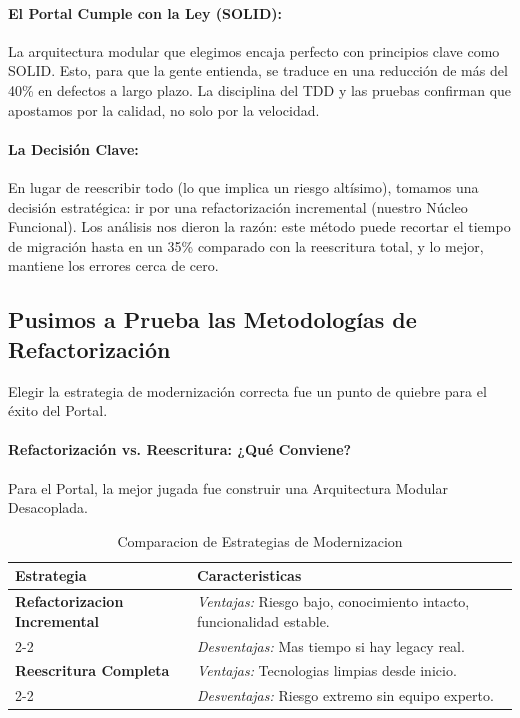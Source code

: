 \paragraph{El Portal Cumple con la Ley (SOLID):}

La arquitectura modular que elegimos encaja perfecto con principios clave como SOLID. Esto, para que la gente entienda, se traduce en una reducción de más del 40\% en defectos a largo plazo. La disciplina del TDD y las pruebas confirman que apostamos por la calidad, no solo por la velocidad.

\paragraph{La Decisión Clave:}

En lugar de reescribir todo (lo que implica un riesgo altísimo), tomamos una decisión estratégica: ir por una refactorización incremental (nuestro Núcleo Funcional). Los análisis nos dieron la razón: este método puede recortar el tiempo de migración hasta en un 35\% comparado con la reescritura total, y lo mejor, mantiene los errores cerca de cero.

\subsection{Pusimos a Prueba las Metodologías de Refactorización}

Elegir la estrategia de modernización correcta fue un punto de quiebre para el éxito del Portal.

\paragraph{Refactorización vs. Reescritura: ¿Qué Conviene?}

Para el Portal, la mejor jugada fue construir una Arquitectura Modular Desacoplada.

\begin{table}[htbp]
\centering
\small
\begin{tabular}{|p{2.8cm}|p{4cm}|}
\hline
\textbf{Estrategia} & \textbf{Caracteristicas} \\
\hline
\textbf{Refactorizacion Incremental} & \textit{Ventajas:} Riesgo bajo, conocimiento intacto, funcionalidad estable. \\
\cline{2-2}
 & \textit{Desventajas:} Mas tiempo si hay legacy real. \\
\hline
\textbf{Reescritura Completa} & \textit{Ventajas:} Tecnologias limpias desde inicio. \\
\cline{2-2}
 & \textit{Desventajas:} Riesgo extremo sin equipo experto. \\
\hline
\end{tabular}
\caption{Comparacion de Estrategias de Modernizacion}
\end{table}

